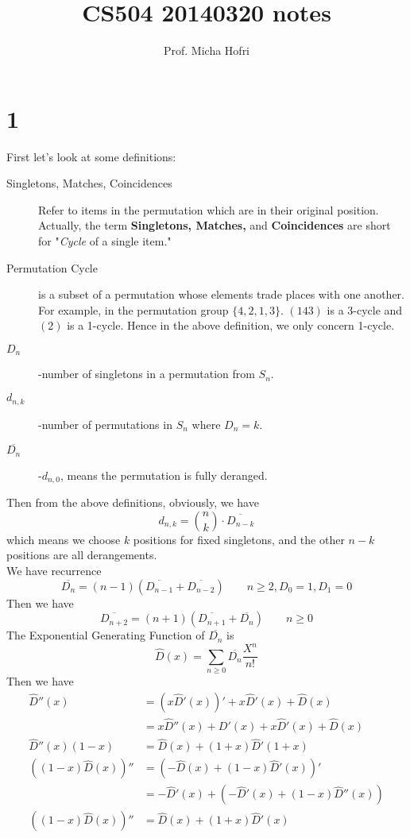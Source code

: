 \documentclass{article}
\author{Prof. Micha Hofri}
\title{CS504 20140320 notes}
\begin{document}
\maketitle
\section{1}
First let's look at some definitions:\\
\begin{description}
\item[Singletons, Matches, Coincidences] Refer to items in the
  permutation which are in their original position. Actually, the term
  \textbf{Singletons, Matches,} and \textbf{Coincidences} are
  short for "\emph{Cycle} of a single item."
\item[Permutation Cycle] is a subset of a permutation whose elements
  trade places with one another. For example, in the permutation group
  $\{4,2,1,3\}$. $(143)$ is a 3-cycle and $(2)$ is a 1-cycle. Hence in
  the above definition, we only concern 1-cycle.
\item[$D_n$] -number of singletons in a permutation from $S_n$.
\item[$d_{n,k}$] -number of permutations in $S_n$ where $D_n=k$.
\item[$\overline{D_n}$] -$d_{n,0}$, means the permutation is fully deranged.
\end{description}
Then from the above definitions, obviously, we have \\
\[
d_{n,k}=\binom{n}{k}\cdot\overline{D_{n-k}}
\]
which means we choose $k$ positions for fixed  singletons, and the
other $n-k$ positions are all derangements.\\
We have recurrence
\[
\overline{D_n}=(n-1)(\overline{D_{n-1}}+\overline{D_{n-2}})\qquad
n\geq 2, D_0=1,D_1=0
\]
Then we have
\[
\overline{D_{n+2}}=(n+1)(\overline{D_{n+1}}+\overline{D_n})\qquad n\geq 0
\]
The Exponential Generating Function of $\overline{D_n}$ is
\[
\hat{D}(x)=\sum_{n\geq 0}\overline{D_n}\frac{X^n}{n!}
\]
Then we have\\
\begin{align*}
  \hat{D}''(x)&=\left(x\hat{D}'(x)\right)'+x\hat{D}'(x)+\hat{D}(x)\\
  &=x\hat{D}''(x)+D'(x)+x\hat{D}'(x)+\hat{D}(x)\\
  \hat{D}''(x)(1-x)&=\hat{D}(x)+(1+x)\hat{D}'(1+x)\\
  \left((1-x)\hat{D}(x)\right)''&=(-\hat{D}(x)+(1-x)\hat{D}'(x))'\\
  &=-\hat{D}'(x)+(-\hat{D}'(x)+(1-x)\hat{D}''(x))\\
  \left((1-x)\hat{D}(x)\right)''&=\hat{D}(x)+(1+x)\hat{D}'(x)
\end{align*}
\end{document}
